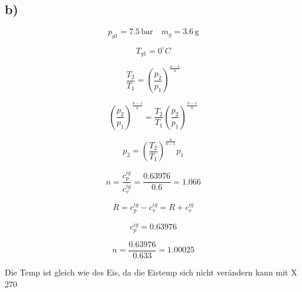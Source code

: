 

\subsection*{b)}
\[
p_{g1} = 7.5 \, \text{bar} \quad m_{g} = 3.6 \, \text{g}
\]

\[
T_{g1} = 0^\circ C
\]

\[
\frac{T_2}{T_1} = \left( \frac{p_2}{p_1} \right)^{\frac{n-1}{n}}
\]

\[
\left( \frac{p_2}{p_1} \right)^{\frac{n-1}{n}} = \frac{T_2}{T_1} \left( \frac{p_2}{p_1} \right)^{\frac{n-1}{n}}
\]

\[
p_2 = \left( \frac{T_2}{T_1} \right)^{\frac{n}{n-1}} p_1
\]

\[
n = \frac{c_p^{ig}}{c_v^{ig}} = \frac{0.63976}{0.6} = 1.066
\]

\[
R = c_p^{ig} - c_v^{ig} = R + c_v^{ig}
\]

\[
c_p^{ig} = 0.63976
\]

\[
n = \frac{0.63976}{0.633} = 1.00025
\]

Die Temp ist gleich wie des Eis, da die Eistemp sich nicht verändern kann mit X 270